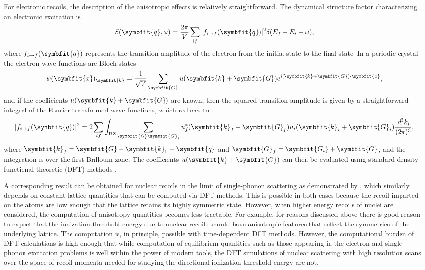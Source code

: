 \documentclass[b5paper, 10pt, twoside]{book}
\renewcommand{\vec}[1]{\symbfit{#1}}
\newcommand{\difd}{\,d}
\begin{document}
For electronic recoils, the description of the anisotropic effects is relatively straightforward. The dynamical structure factor characterizing an electronic excitation is
\begin{equation}
S(\vec{q},\omega)=\frac{2\pi}{V}\sum_{if}|f_{i\rightarrow f}(\vec{q})|^2\delta(E_f-E_i-\omega),
\end{equation}
where $f_{i\rightarrow f}(\vec{q})$ represents the transition amplitude of the electron from the initial state to the final state. In a periodic crystal the electron wave functions are Bloch states
\begin{equation}
\psi(\vec{x})_{\vec{k}}=\frac{1}{\sqrt{V}}\sum_{\vec{G}}u(\vec{k}+\vec{G})e^{i(\vec{k}+\vec{G})\cdot\vec{x}},
\end{equation}
and if the coefficients $u(\vec{k}+\vec{G})$ are known, then the squared transition amplitude is given by a straightforward integral of the Fourier transformed wave functions, which reduces to
\begin{equation}
|f_{i\rightarrow f}(\vec{q})|^2=2\sum_{if}\int_\text{BZ}\sum_{\vec{G}\vec{G}_i}u_f^*(\vec{k}_f+\vec{G}_f)u_i(\vec{k}_i+\vec{G}_i)\frac{\difd^3 k_i}{(2\pi)^3},
\end{equation}
where $\vec{k}_f=\vec{G}-\vec{k}_1-\vec{q}$ and $\vec{G}_f=\vec{G_i}+\vec{G}$, and the integration is over the first Brillouin zone. The coefficients $u(\vec{k}+\vec{G})$ can then be evaluated using standard density functional theoretic (DFT) methods \parencite{EssigEtAl2015}.

A corresponding result can be obtained for nuclear recoils in the limit of single-phonon scattering as demonstrated by \textcite{TrickleEtAl2020}, which similarly depends on constant lattice quantities that can be computed via DFT methods. This is possible in both cases because the recoil imparted on the atoms are low enough that the lattice retains its highly symmetric state. However, when higher energy recoils of nuclei are considered, the computation of anisotropy quantities becomes less tractable. For example, for reasons discussed above there is good reason to expect that the ionization threshold energy due to nuclear recoils should have anisotropic features that reflect the symmetries of the underlying lattice. The computation is, in principle, possible with time-dependent DFT methods. However, the computational burden of DFT calculations is high enough that while computation of equilibrium quantities such as those appearing in the electron and single-phonon excitation problems is well within the power of modern tools, the DFT simulations of nuclear scattering with high resolution scans over the space of recoil momenta needed for studying the directional ionization threshold energy are not.
\end{document}
